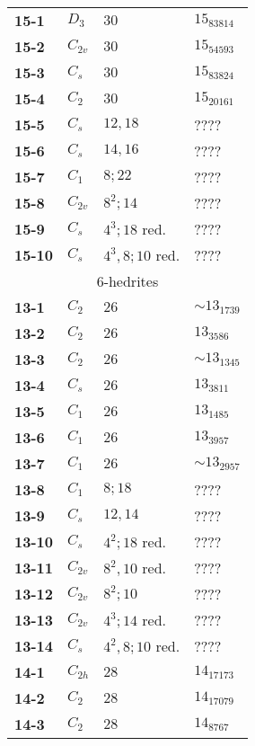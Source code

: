 \documentclass[12pt]{article}
\begin{document}
\begin{table}
\begin{center}
{\begin{minipage}{7cm}
\begin{tabular}{||l|l|l|l||}
{\bf 15-1}      &$D_3$  &$30$   &$15_{83814}$\\
{\bf 15-2}      &$C_{2v}$       &$30$   &$15_{54593}$\\
{\bf 15-3}      &$C_s$  &$30$   &$15_{83824}$\\
{\bf 15-4}      &$C_2$  &$30$   &$15_{20161}$\\
{\bf 15-5}      &$C_s$  &$12,18$        &????\\
{\bf 15-6}      &$C_s$  &$14,16$        &????\\
{\bf 15-7}      &$C_1$  &$8;22$ &????\\
{\bf 15-8}      &$C_{2v}$       &       $8^2;14$&????\\
{\bf 15-9}      &$C_s$  &$4^3; 18$ red. &????\\
{\bf 15-10}     &$C_s$  &$4^3, 8; 10$ red.      &????\\\hline\hline
\multicolumn{4}{||c||}{$6$-hedrites}\\\hline
{\bf 13-1}      &$C_2$  &$26$           &$\sim 13_{1739}$\\
{\bf 13-2}      &$C_2$  &$26$           &$13_{3586}$\\
{\bf 13-3}      &$C_2$  &$26$           &$\sim 13_{1345}$\\
{\bf 13-4}      &$C_s$  &$26$           &$13_{3811}$\\
{\bf 13-5}      &$C_1$  &$26$           &$13_{1485}$\\
{\bf 13-6}      &$C_1$  &$26$           &$13_{3957}$\\
{\bf 13-7}      &$C_1$  &$26$           &$\sim 13_{2957}$\\
{\bf 13-8}      &$C_1$  &$8; 18$                &????\\
{\bf 13-9}      &$C_s$  &$12, 14$               &????\\
{\bf 13-10}     &$C_s$  &$4^2; 18$ red. &????\\
{\bf 13-11}     &$C_{2v}$       &$8^2, 10$ red. &????\\
{\bf 13-12}     &$C_{2v}$       &$8^2; 10$      &????\\
{\bf 13-13}     &$C_{2v}$       &$4^3; 14$ red. &????\\
{\bf 13-14}     &$C_s$  &$4^2,8;10$ red.        &????\\\hline
{\bf 14-1}      &$C_{2h}$       &$28$           &$14_{17173}$\\
{\bf 14-2}      &$C_{2}$        &$28$           &$14_{17079}$\\
{\bf 14-3}      &$C_2$  &$28$           &$14_{8767}$\\

\end{tabular}
\end{minipage}}
\end{center}
\end{table}
\end{document}
